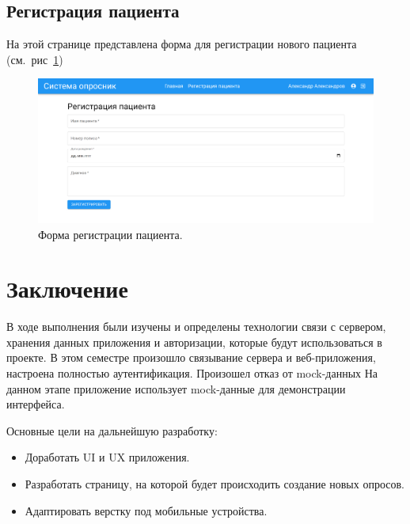 \documentclass[a4paper,12pt]{article}
\begin{document}
    \newpage
    \subsection{Регистрация пациента}\label{subsec:-3}
    На этой странице представлена форма для регистрации нового пациента (см.\ рис~\ref{fig:figure7})
    \begin{figure}[ht]
        \includegraphics[scale=0.17]{images/screenshots/registration}
        \caption{Форма регистрации пациента.}\label{fig:figure7}
    \end{figure}

    \newpage
    \section*{Заключение}
    \label{sec:3}
    В ходе выполнения были изучены и определены технологии связи с сервером, хранения данных приложения и авторизации, которые будут использоваться в проекте.
    В этом семестре произошло связывание сервера и веб-приложения, настроена полностью аутентификация.
    Произошел отказ от mock-данных
    На данном этапе приложение использует mock-данные для демонстрации интерфейса.

    Основные цели на дальнейшую разработку:

    \begin{itemize}

        \item Доработать UI и UX приложения.

        \item Разработать страницу, на которой будет происходить создание новых опросов.

        \item Адаптировать верстку под мобильные устройства.

    \end{itemize}
\end{document}
